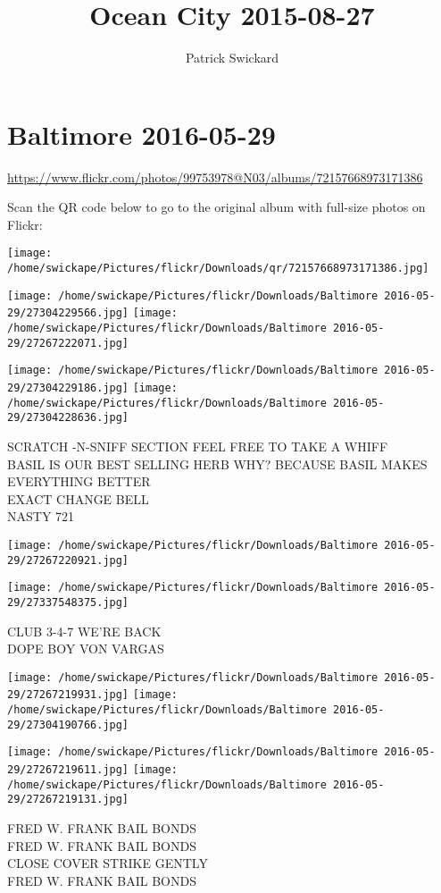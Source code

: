 \documentclass[10pt,letterpaper]{article}
\title{Ocean City 2015-08-27}
\author{Patrick Swickard}
\date{}
\begin{document}
\section*{Baltimore 2016-05-29}

\url{https://www.flickr.com/photos/99753978@N03/albums/72157668973171386}

Scan the QR code below to go to the original album with full-size photos on Flickr:

\texttt{[image: /home/swickape/Pictures/flickr/Downloads/qr/72157668973171386.jpg]}
\pagebreak

\texttt{[image: /home/swickape/Pictures/flickr/Downloads/Baltimore 2016-05-29/27304229566.jpg]}
\texttt{[image: /home/swickape/Pictures/flickr/Downloads/Baltimore 2016-05-29/27267222071.jpg]}

\texttt{[image: /home/swickape/Pictures/flickr/Downloads/Baltimore 2016-05-29/27304229186.jpg]}
\texttt{[image: /home/swickape/Pictures/flickr/Downloads/Baltimore 2016-05-29/27304228636.jpg]}

SCRATCH {-}N{-}SNIFF SECTION FEEL FREE TO TAKE A WHIFF\\
BASIL IS OUR BEST SELLING HERB WHY?  BECAUSE BASIL MAKES EVERYTHING BETTER\\
EXACT CHANGE BELL\\
NASTY 721
\pagebreak

\texttt{[image: /home/swickape/Pictures/flickr/Downloads/Baltimore 2016-05-29/27267220921.jpg]}

\vspace{0.25in}
\texttt{[image: /home/swickape/Pictures/flickr/Downloads/Baltimore 2016-05-29/27337548375.jpg]}

CLUB 3{-}4{-}7 WE'RE BACK\\
DOPE BOY VON VARGAS
\pagebreak

\texttt{[image: /home/swickape/Pictures/flickr/Downloads/Baltimore 2016-05-29/27267219931.jpg]}
\texttt{[image: /home/swickape/Pictures/flickr/Downloads/Baltimore 2016-05-29/27304190766.jpg]}

\texttt{[image: /home/swickape/Pictures/flickr/Downloads/Baltimore 2016-05-29/27267219611.jpg]}
\texttt{[image: /home/swickape/Pictures/flickr/Downloads/Baltimore 2016-05-29/27267219131.jpg]}

FRED W. FRANK BAIL BONDS\\
FRED W. FRANK BAIL BONDS\\
CLOSE COVER STRIKE GENTLY\\
FRED W. FRANK BAIL BONDS
\pagebreak
\end{document}
